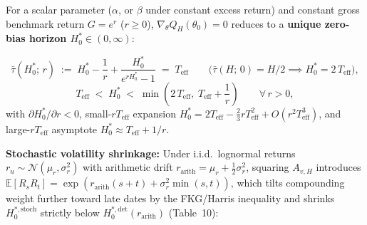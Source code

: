 \documentclass[10.5pt]{article}
\newcommand{\E}{\mathbb{E}}
\begin{document}
For a scalar parameter ($\alpha$, or $\beta$ under constant excess return) and constant gross benchmark return $G = e^r$ ($r\ge 0$), $\nabla_\theta Q_H(\theta_0) = 0$ reduces to a \textbf{unique zero-bias horizon $H_0^\ast \in (0,\infty)$}:
\begin{keybox}[title={Exact Continuous-Time Duration-Matching Equation and Global Bounds (Proposition~2(i))}]
\[
\bar\tau(H_0^\ast;\,r) \;:=\; H_0^\ast - \frac{1}{r} + \frac{H_0^\ast}{e^{r H_0^\ast} - 1} \;=\; T_{\mathrm{eff}}
\qquad\bigl(\bar\tau(H;\,0) = H/2 \implies H_0^\ast = 2\,T_{\mathrm{eff}}\bigr),
\]
\[
T_{\mathrm{eff}} \;<\; H_0^\ast \;<\; \min\!\left(2\,T_{\mathrm{eff}},\; T_{\mathrm{eff}} + \frac{1}{r}\right) \qquad \forall\, r > 0,
\]
with $\partial H_0^\ast/\partial r < 0$, small-$rT_{\mathrm{eff}}$ expansion $H_0^\ast = 2T_{\mathrm{eff}} - \frac{2}{3}rT_{\mathrm{eff}}^2 + O(r^2 T_{\mathrm{eff}}^3)$, and large-$rT_{\mathrm{eff}}$ asymptote $H_0^\ast \approx T_{\mathrm{eff}} + 1/r$.
\end{keybox}
\textbf{Stochastic volatility shrinkage:} Under i.i.d.\ lognormal returns $r_u\sim\mathcal{N}(\mu_r,\sigma_r^2)$ with arithmetic drift $r_{\mathrm{arith}} = \mu_r + \frac{1}{2}\sigma_r^2$, squaring $A_{v,H}$ introduces $\E[R_s R_t] = \exp(r_{\mathrm{arith}}(s+t) + \sigma_r^2\min(s,t))$, which tilts compounding weight further toward late dates by the FKG/Harris inequality and shrinks $H_0^{\ast,\mathrm{stoch}}$ strictly below $H_0^{\ast,\mathrm{det}}(r_{\mathrm{arith}})$ (Table~10):

{\footnotesize
\begin{center}
\end{center}
}
\end{document}
